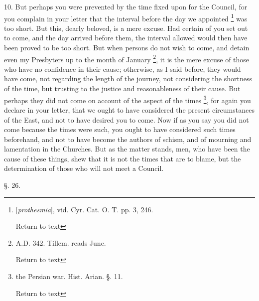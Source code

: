 10. But perhaps you were prevented by the time
fixed upon for the Council, for you complain in your letter that the
interval before the day we appointed \footnote{[\emph{prothesmia}], vid. Cyr. Cat. O. T. pp. 3, 246.

Return to text} was too short. But this, dearly beloved, is a mere excuse. Had
certain of you set out to come, and the day arrived before them, the
interval allowed would then have been proved to be too short. But when
persons do not wish to come, and detain even my Presbyters up to the
month of January \footnote{A.D.
342. Tillem. reads June.

Return to text}, it
is the mere excuse of those who have no confidence in their cause;
otherwise, as I said before, they would have come, not regarding the
length of the journey, not considering the shortness of the time,
but trusting to the justice and reasonableness of their cause. But
perhaps they did not come on account of the aspect of the times \footnote{the Persian war. Hist. Arian. §. 11.

Return to text}, for again you declare in your letter, that we ought to have
considered the present circumstances of the East, and not to have
desired you to come. Now if as you say you did not come because the
times were such, you ought to have considered such times beforehand,
and not to have become the authors of schism, and of mourning and
lamentation in the Churches. But as the matter stands, men, who have
been the cause of these things, shew that it is not the times that are
to blame, but the determination of those who will not meet a Council.

§. 26.

